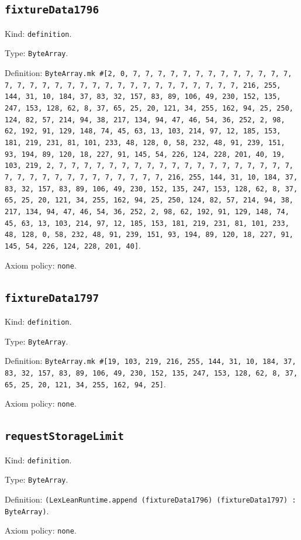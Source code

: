 \documentclass[11pt]{article}
\begin{document}
\subsection*{\texttt{fixtureData1796}}
\noindent Kind: \texttt{definition}.\par
\noindent Type: \texttt{ByteArray}.\par
\noindent Definition: \texttt{ByteArray.mk \#[2, 0, 7, 7, 7, 7, 7, 7, 7, 7, 7, 7, 7, 7, 7, 7, 7, 7, 7, 7, 7, 7, 7, 7, 7, 7, 7, 7, 7, 7, 7, 7, 7, 7, 216, 255, 144, 31, 10, 184, 37, 83, 32, 157, 83, 89, 106, 49, 230, 152, 135, 247, 153, 128, 62, 8, 37, 65, 25, 20, 121, 34, 255, 162, 94, 25, 250, 124, 82, 57, 214, 94, 38, 217, 134, 94, 47, 46, 54, 36, 252, 2, 98, 62, 192, 91, 129, 148, 74, 45, 63, 13, 103, 214, 97, 12, 185, 153, 181, 219, 231, 81, 101, 233, 48, 128, 0, 58, 232, 48, 91, 239, 151, 93, 194, 89, 120, 18, 227, 91, 145, 54, 226, 124, 228, 201, 40, 19, 103, 219, 2, 7, 7, 7, 7, 7, 7, 7, 7, 7, 7, 7, 7, 7, 7, 7, 7, 7, 7, 7, 7, 7, 7, 7, 7, 7, 7, 7, 7, 7, 7, 7, 7, 216, 255, 144, 31, 10, 184, 37, 83, 32, 157, 83, 89, 106, 49, 230, 152, 135, 247, 153, 128, 62, 8, 37, 65, 25, 20, 121, 34, 255, 162, 94, 25, 250, 124, 82, 57, 214, 94, 38, 217, 134, 94, 47, 46, 54, 36, 252, 2, 98, 62, 192, 91, 129, 148, 74, 45, 63, 13, 103, 214, 97, 12, 185, 153, 181, 219, 231, 81, 101, 233, 48, 128, 0, 58, 232, 48, 91, 239, 151, 93, 194, 89, 120, 18, 227, 91, 145, 54, 226, 124, 228, 201, 40]}.\par
\noindent Axiom policy: \texttt{none}.\par
\subsection*{\texttt{fixtureData1797}}
\noindent Kind: \texttt{definition}.\par
\noindent Type: \texttt{ByteArray}.\par
\noindent Definition: \texttt{ByteArray.mk \#[19, 103, 219, 216, 255, 144, 31, 10, 184, 37, 83, 32, 157, 83, 89, 106, 49, 230, 152, 135, 247, 153, 128, 62, 8, 37, 65, 25, 20, 121, 34, 255, 162, 94, 25]}.\par
\noindent Axiom policy: \texttt{none}.\par
\subsection*{\texttt{requestStorageLimit}}
\noindent Kind: \texttt{definition}.\par
\noindent Type: \texttt{ByteArray}.\par
\noindent Definition: \texttt{(LexLeanRuntime.append (fixtureData1796) (fixtureData1797) : ByteArray)}.\par
\noindent Axiom policy: \texttt{none}.\par
\end{document}
